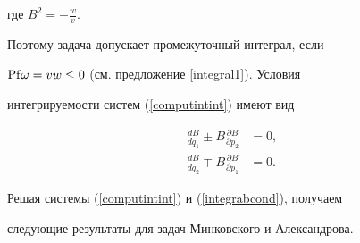 где $B^2=-\frac wv$.


Поэтому задача допускает промежуточный интеграл, если 


${\operatorname{Pf}}\omega =vw\leq 0$ (см. предложение \ref{integral1}). Условия


интегрируемости систем (\ref{computintint}) имеют вид


\begin{equation}


\label{integrabcond} 


\begin{split}


\frac{dB}{dq_1}\pm B\frac{\partial B}{\partial p_2} &=0,\\


\frac{dB}{dq_2}\mp B\frac{\partial B}{\partial p_1} &=0.


\end{split}


\end{equation}





Решая системы (\ref{computintint}) и (\ref{integrabcond}), получаем 


следующие результаты для задач Минковского и Александрова.






